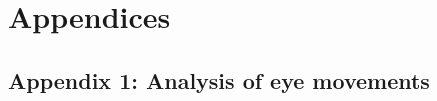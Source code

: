 \documentclass[12pt,english]{article}%
\begin{document}
 

\section{Appendices}
\subsection{Appendix 1: Analysis of eye movements}
\label{app:em}
\end{document}
